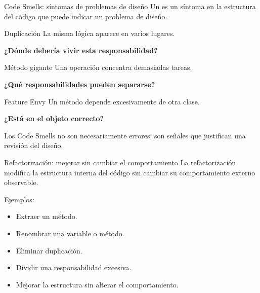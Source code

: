\documentclass[11pt,aspectratio=169]{beamer}
\begin{document}
\begin{frame}{Code Smells: síntomas de problemas de diseño}
Un  es un síntoma en la estructura del código que puede
indicar un problema de diseño.

\begin{threecol}
  \begin{block}{Duplicación}
    La misma lógica aparece en varios lugares.
    \par\medskip\centering\textbf{¿Dónde debería vivir esta responsabilidad?}
  \end{block}
\nextcol
  \begin{block}{Método gigante}
    Una operación concentra demasiadas tareas.
    \par\medskip\centering\textbf{¿Qué responsabilidades pueden separarse?}
  \end{block}
\nextcol
  \begin{block}{Feature Envy}
    Un método depende excesivamente de otra clase.
    \par\medskip\centering\textbf{¿Está en el objeto correcto?}
  \end{block}
\end{threecol}

\begin{callout}[halign=center]
  Los Code Smells no son necesariamente errores: son señales que justifican
  una revisión del diseño.
\end{callout}
\end{frame}

\begin{frame}{Refactorización: mejorar sin cambiar el comportamiento}
La refactorización modifica la estructura interna del código sin cambiar su
comportamiento externo observable.


Ejemplos:
\begin{itemize}
  \item Extraer un método.
  \item Renombrar una variable o método.
  \item Eliminar duplicación.
  \item Dividir una responsabilidad excesiva.
  \item Mejorar la estructura sin alterar el comportamiento.
\end{itemize}
\end{frame}
\end{document}

